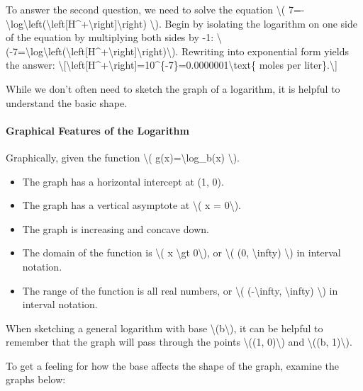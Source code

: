 To answer the second question, we need to solve the equation
\textbackslash{}(
7=-\textbackslash{}log\textbackslash{}left(\textbackslash{}left{[}H\^{}+\textbackslash{}right{]}\textbackslash{}right)
\textbackslash{}). Begin by isolating the logarithm on one side of the
equation by multiplying both sides by -1:
\textbackslash{}(-7=\textbackslash{}log\textbackslash{}left(\textbackslash{}left{[}H\^{}+\textbackslash{}right{]}\textbackslash{}right)\textbackslash{}).
Rewriting into exponential form yields the answer:
\textbackslash{}{[}\textbackslash{}left{[}H\^{}+\textbackslash{}right{]}=10\^{}\{-7\}=0.0000001\textbackslash{}text\{
moles per liter\}.\textbackslash{}{]}

While we don't often need to sketch the graph of a logarithm, it is
helpful to understand the basic shape.

\hypertarget{graphical-features-of-the-logarithm}{%
\paragraph{Graphical Features of the
Logarithm}\label{graphical-features-of-the-logarithm}}

Graphically, given the function \textbackslash{}(
g(x)=\textbackslash{}log\_b(x) \textbackslash{}).

\begin{itemize}
\tightlist
\item
  The graph has a horizontal intercept at (1, 0).
\item
  The graph has a vertical asymptote at \textbackslash{}( x =
  0\textbackslash{}).
\item
  The graph is increasing and concave down.
\item
  The domain of the function is \textbackslash{}( x \textbackslash{}gt
  0\textbackslash{}), or \textbackslash{}( (0, \textbackslash{}infty)
  \textbackslash{}) in interval notation.
\item
  The range of the function is all real numbers, or \textbackslash{}(
  (-\textbackslash{}infty, \textbackslash{}infty) \textbackslash{}) in
  interval notation.
\end{itemize}

When sketching a general logarithm with base
\textbackslash{}(b\textbackslash{}), it can be helpful to remember that
the graph will pass through the points \textbackslash{}((1,
0)\textbackslash{}) and \textbackslash{}((b, 1)\textbackslash{}).

To get a feeling for how the base affects the shape of the graph,
examine the graphs below:

